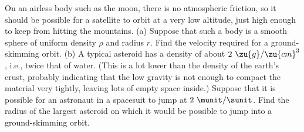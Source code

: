 On an airless body such as the moon, there is  no atmospheric friction, so it
  should be possible for a satellite to orbit at a very low   
  altitude, just high enough to keep from hitting the
  mountains.
(a) Suppose that such a body is a smooth sphere of uniform density $\rho$ and
radius $r$. Find the velocity required for a ground-skimming orbit.\answercheck\hwendpart
(b) A typical asteroid has a density of about $2\ \zu{g}/\zu{cm}^3$, i.e., twice that of
water. (This is a lot lower than the density of the earth's crust, probably indicating that
the low gravity is not enough to compact the material very tightly, leaving lots of empty
space inside.) Suppose that it is possible for an astronaut in a spacesuit to jump at
$2\ \munit/\sunit$. Find the radius of the largest asteroid on which it would be possible
to jump into a ground-skimming orbit.\answercheck
